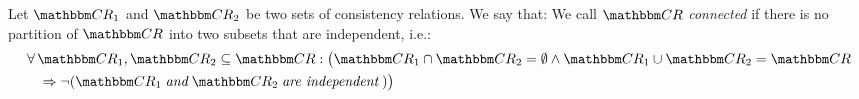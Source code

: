 \begin{definition}
    \label{def:independence}
    Let $\consistencyrelationset{CR}_{1}$ and $\consistencyrelationset{CR}_{2}$ be two sets of consistency relations. We say that:
    We call $\consistencyrelationset{CR}$ \emph{connected} if there is no partition of $\consistencyrelationset{CR}$ into two subsets that are independent, i.e.:
    \begin{align*}
        &
        \forall \consistencyrelationset{CR}_{1}, \consistencyrelationset{CR}_{2} \subseteq \consistencyrelationset{CR} :
        \big(
            \consistencyrelationset{CR}_{1} \cap \consistencyrelationset{CR}_{2} = \emptyset \land \consistencyrelationset{CR}_{1} \cup \consistencyrelationset{CR}_{2} = \consistencyrelationset{CR}  \\
            & \formulaskip
            \Rightarrow \neg (\consistencyrelationset{CR}_{1} \andmath \consistencyrelationset{CR}_{2} \mathtextspacearound{are independent})
        \big)
    \end{align*}
\end{definition}

